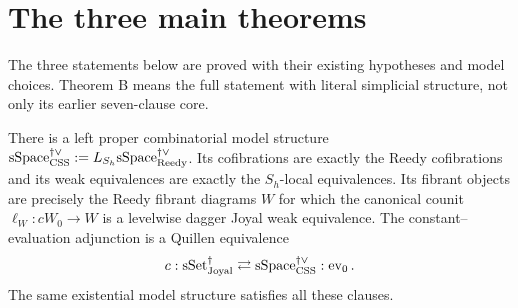 \section{The three main theorems}

The three statements below are proved with their existing hypotheses and model choices. Theorem B means the full statement with literal simplicial structure, not only its earlier seven-clause core.

\begin{resultblock}
\begin{theorem}
\label{catalogue:MainA}
There is a left proper combinatorial model structure
$\mathrm{sSpace}^{\dag\vee}_{\mathrm{CSS}}:=L_{S_h}\mathrm{sSpace}^{\dag\vee}_{\mathrm{Reedy}}$.
Its cofibrations are exactly the Reedy cofibrations and its weak equivalences are exactly the $S_h$-local equivalences.
Its fibrant objects are precisely the Reedy fibrant diagrams $W$ for which the canonical counit $\ell_W:cW_0\to W$ is a levelwise dagger Joyal weak equivalence.
The constant--evaluation adjunction is a Quillen equivalence
\begin{align}
 c:\mathrm{sSet}^{\dag}_{\mathrm{Joyal}}\rightleftarrows\mathrm{sSpace}^{\dag\vee}_{\mathrm{CSS}}:\operatorname{ev}_0.
\end{align}
The same existential model structure satisfies all these clauses.
\end{theorem}

\end{resultblock}

